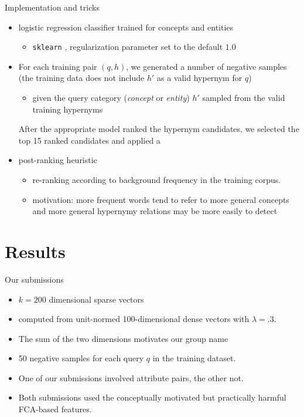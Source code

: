 \documentclass{beamer}
\newlength{\onecolwid}
\newcommand{\bull}[1]{
  \begin{itemize}
    \item #1
  \end{itemize}
}
\begin{document}
\begin{frame}[t]
\begin{columns}[t]
\begin{column}{\onecolwid}
  \begin{block}{Implementation and tricks}
    \begin{itemize}
      \item \alert{logistic regression} classifier trained for concepts and
        entities \bull{\texttt{sklearn}
        \citep{Pedregosa:2011},%
        regularization parameter set to the default $1.0$}

      \item For each training pair $(q,h)$, we generated a number of \alert{negative
        samples} (the training data does not include $h'$ as a valid hypernym for
        $q$) 
        \bull{given the query category (\textit{concept} or \textit{entity}) $h'$
        sampled from the valid training hypernyms}

        After the appropriate model ranked the hypernym candidates, we selected
        the top 15 ranked candidates and applied a 
      \item \alert{post-ranking} heuristic 
        \begin{itemize}
          \item re-ranking according to background frequency in the training corpus. 
          \item motivation: more frequent words tend to refer to more general concepts
            and more general hypernymy relations may be more easily to detect
        \end{itemize}
    \end{itemize}
  \end{block}

  \section{Results} \label{sec:results}

  \begin{block}{Our submissions}
    \begin{itemize} 
      \item $k=200$ dimensional sparse vectors 
      \item computed from unit-normed 100-dimensional dense vectors with
        $\lambda=.3$. 
      \item The sum of the two dimensions motivates our group name
      \item 50 negative samples for each query $q$ in the training dataset. 
      \item One of our submissions involved attribute pairs, the other not. 
      \item Both submissions used the conceptually motivated but practically
        harmful FCA-based features.
    \end{itemize}


\end{block}
\end{column}
\end{columns}
\end{frame}
\end{document}
